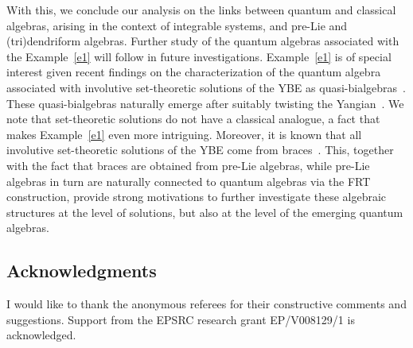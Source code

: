 \documentclass[pdftex]{sigma}
\numberwithin{equation}{section}
\theoremstyle{definition}
\begin{document}
With this, we conclude our analysis on the links between quantum and classical algebras, arising in the context of integrable systems, and pre-Lie and (tri)dendriform algebras. Further study of the quantum algebras associated with the Example~\ref{e1} will follow in future investigations. Example~\ref{e1} is of special interest given recent findings on the characterization of the quantum algebra associated with involutive set-theoretic solutions of the YBE as quasi-bialgebras~\cite{Doikoutw, DoGhVl}. These quasi-bialgebras naturally emerge after suitably twisting the Yangian~\cite{Doikoutw}.
We note that set-theoretic solutions do not have a classical analogue, a fact that makes Example~\ref{e1} even more intriguing.
Moreover, it is known that all involutive set-theoretic solutions of the YBE come from braces~\cite{Jesp, Rump1}. This, together with the fact that braces are obtained from pre-Lie algebras, while {pre-Lie} algebras in turn are naturally connected to quantum algebras via the FRT construction, provide strong motivations to further investigate these algebraic structures at the level of solutions, but also at the level of the emerging quantum algebras.


\subsection*{Acknowledgments}
I would like to thank the anonymous referees for their constructive comments and suggestions. Support from the EPSRC research grant EP/V008129/1 is acknowledged.
\end{document}
